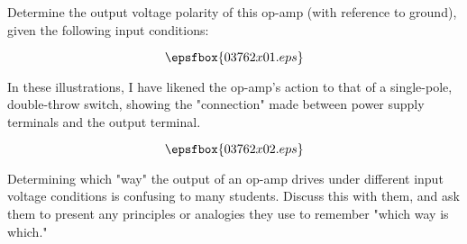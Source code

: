 

Determine the output voltage polarity of this op-amp (with reference to ground), given the following input conditions:

$$\epsfbox{03762x01.eps}$$







In these illustrations, I have likened the op-amp's action to that of a single-pole, double-throw switch, showing the "connection" made between power supply terminals and the output terminal.

$$\epsfbox{03762x02.eps}$$







Determining which "way" the output of an op-amp drives under different input voltage conditions is confusing to many students.  Discuss this with them, and ask them to present any principles or analogies they use to remember "which way is which."




